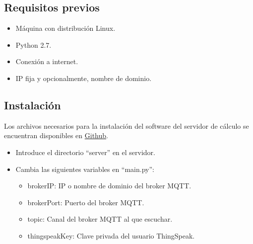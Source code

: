 \subsection{Requisitos previos}
\label{makereference7.3.1}

\begin{itemize}
\item Máquina con distribución Linux.
\item Python 2.7.
\item Conexión a internet.
\item IP fija y opcionalmente, nombre de dominio.
\end{itemize}

\subsection{Instalación}
\label{makereference7.3.2}
Los archivos necesarios para la instalación del software del servidor de cálculo se encuentran disponibles en \href{https://github.com/MrSlide22/TFG/server}{Github}.

\begin{itemize}
	\item Introduce el directorio ``server'' en el servidor.
	\item Cambia las siguientes variables en ``main.py'':
	\begin{itemize}
	\item brokerIP: IP o nombre de dominio del broker MQTT.
	\item brokerPort: Puerto del broker MQTT.
	\item topic: Canal del broker MQTT al que escuchar.
	\item thingspeakKey: Clave privada del usuario ThingSpeak.
	\end{itemize}
\end{itemize}